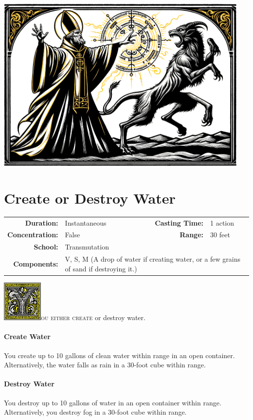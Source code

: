 \documentclass[12pt,showtrims]{memoir}
\begin{document}
\vfill
\vfill
{
\centering
\includegraphics[width=0.95\textwidth]{spell_artwork/command.png}
}
\vfill
\newpage
\section*{Create or Destroy Water}

{
\small\centering\vspace{-6pt}
\begin{tabular}{rlrl}
\toprule

\textbf{Duration:} & Instantaneous &
\textbf{Casting Time:} & 1 action \\
\textbf{Concentration:} & False &
\textbf{Range:} & 30 feet \\
\textbf{School:} & Transmutation \\
\textbf{Components:} & \multicolumn{3}{p{0.7\textwidth}}{V, S, M (A drop of water if creating water, or a few grains of sand if destroying it.)}\\

\bottomrule
\end{tabular}
}

\vspace{1\baselineskip}\noindent
\lettrine[lines=4]{\includegraphics[height=58pt]{initials/Y.png}}{ou either create} or destroy water.

\vspace{3\baselineskip}\noindent
\paragraph{Create Water} You create up to 10 gallons of clean water within range in an open container. Alternatively, the water falls as rain in a 30-foot cube within range. \paragraph{Destroy Water} You destroy up to 10 gallons of water in an open container within range. Alternatively, you destroy fog in a 30-foot cube within range.
\end{document}
